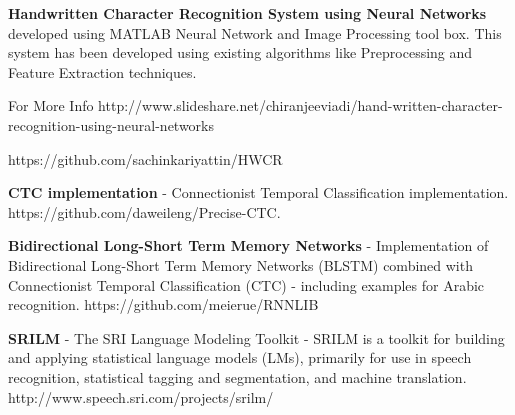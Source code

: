 \textbf{Handwritten Character Recognition System using Neural Networks} developed using MATLAB Neural Network and Image Processing tool box. This system has been developed using existing algorithms like Preprocessing and Feature Extraction techniques.

For More Info http://www.slideshare.net/chiranjeeviadi/hand-written-character-recognition-using-neural-networks

https://github.com/sachinkariyattin/HWCR


\textbf{CTC implementation} - Connectionist Temporal Classification implementation. https://github.com/daweileng/Precise-CTC.

\textbf{Bidirectional Long-Short Term Memory Networks} - Implementation of Bidirectional Long-Short Term Memory Networks (BLSTM) combined with Connectionist Temporal Classification (CTC) - including examples for Arabic recognition. https://github.com/meierue/RNNLIB

\textbf{SRILM} - The SRI Language Modeling Toolkit - SRILM is a toolkit for building and applying statistical language models (LMs), primarily for use in speech recognition, statistical tagging and segmentation, and machine translation. http://www.speech.sri.com/projects/srilm/


